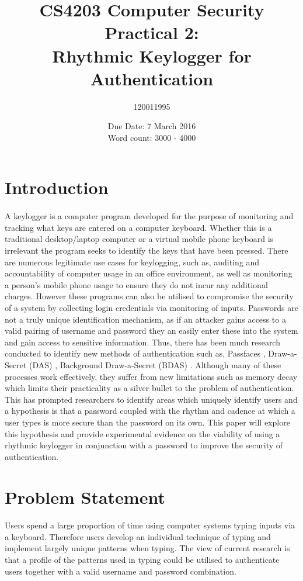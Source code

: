 \documentclass{article}
\title{CS4203 Computer Security Practical 2: \\ Rhythmic Keylogger for Authentication}
\author{120011995}
\date{Due Date: 7 March 2016 \break \\ Word count: 3000 - 4000}
\begin{document}
\maketitle

\section{Introduction}
\paragraph{}
A keylogger is a computer program developed for the purpose of monitoring and tracking what keys are entered on a computer keyboard. Whether this is a traditional desktop/laptop computer or a virtual mobile phone keyboard is irrelevant the program seeks to identify the keys that have been pressed. There are numerous legitimate use cases for keylogging, such as, auditing and accountability of computer usage in an office environment, as well as monitoring a person's mobile phone usage to ensure they do not incur any additional charges. However these programs can also be utilised to compromise the security of a system by collecting login credentials via monitoring of inputs. Passwords are not a truly unique identification mechanism, as if an attacker gains access to a valid pairing of username and password they an easily enter these into the system and gain access to sensitive information. Thus, there has been much research conducted to identify new methods of authentication such as, Passfaces \parencite{Dunphy}, Draw-a-Secret (DAS) \parencite{DunphyYan}, Background
Draw-a-Secret (BDAS) \parencite{DunphyYan}. Although many of these processes work effectively, they suffer from new limitations such as memory decay which limits their practicality as a silver bullet to the problem of authentication. This has prompted researchers to identify areas which uniquely identify users and a hypothesis is that a password coupled with the rhythm and cadence at which a user types is more secure than the password on its own. This paper will explore this hypothesis and provide experimental evidence on the viability of using a rhythmic keylogger in conjunction with a password to improve the security of authentication.         

\section{Problem Statement}
\paragraph{}
Users spend a large proportion of time using computer systems typing inputs via a keyboard. Therefore users develop an individual technique of typing and implement  largely unique patterns when typing. The view of current research is that a profile of the patterns used in typing could be utilised to authenticate users together with a valid username and password combination. 
\end{document}
